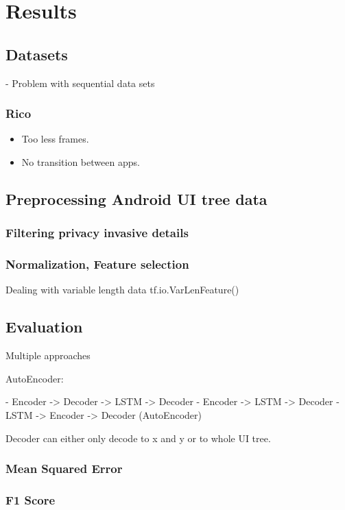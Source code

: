 \chapter{Results}

\section{Datasets}

- Problem with sequential data sets

\subsection{Rico}

\begin{itemize}
  \item Too less frames.
  \item No transition between apps.
\end{itemize}

\section{Preprocessing Android UI tree data}
\subsection{Filtering privacy invasive details}
\subsection{Normalization, Feature selection}

Dealing with variable length data tf.io.VarLenFeature()

\section{Evaluation}


Multiple approaches

AutoEncoder:

- Encoder -> Decoder -> LSTM -> Decoder
- Encoder -> LSTM -> Decoder
- LSTM -> Encoder -> Decoder (AutoEncoder)

Decoder can either only decode to x and y or to whole UI tree.


\subsection{Mean Squared Error}
\subsection{F1 Score}